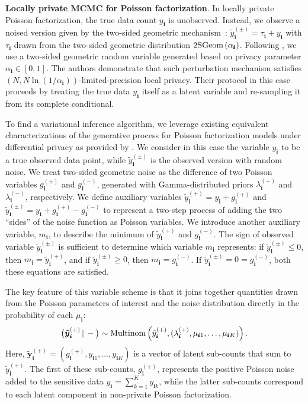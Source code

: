 \documentclass{article}
\newcommand{\subs}{\pmb{i}}
\newcommand{\wsup}[2]{#1_{\subs}^{(#2)}}
\newcommand{\ytP}{\wsup{\tilde{y}}{+}}
\newcommand{\ytPM}{\wsup{\tilde{y}}{\pm}}
\newcommand{\ysk}{y_{\subs k}}
\newcommand{\ys}{y_{\subs}}
\newcommand{\taus}{\tau_{\subs}}
\newcommand{\lamP}{\wsup{\lambda}{+}}
\newcommand{\lamM}{\wsup{\lambda}{-}}
\newcommand{\gP}{\wsup{g}{+}}
\newcommand{\gM}{\wsup{g}{-}}
\newcommand{\mus}{\mu_{\subs}}
\newcommand{\ms}{m_{\subs}}
\newcommand{\yvtP}{\boldsymbol{\tilde{y}}_{\subs}^{(+)}}
\newcommand{\Multi}[1]{\textup{Multinom}\left( #1 \right)}
\newcommand{\Geo}[1]{\textup{2SGeom}\left( #1 \right)}
\newcommand{\given}{\,|\,}
\newcommand{\compcond}[1]{\big(#1\given-\big)}
\begin{document}
  \textbf{Locally private MCMC for Poisson factorization}.  In locally
  private Poisson factorization, the true data count $\ys$ is
  unobserved. Instead, we observe a noised version given by the
  two-sided geometric mechanism~\citep{ghosh2012universally}:
  $\ytPM = \taus + \ys$ with $\taus$ drawn from the two-sided
  geometric distribution $\Geo{\alpha_{\subs}}$. Following
  \cite{schein2018locally}, we use a two-sided geometric random
  variable generated based on privacy parameter
  $\alpha_{\subs} \in [0,1]$.  The authors demonstrate that such
  perturbation mechanism satisfies
  $(N, N \ln(1/\alpha_{\subs}))$-limited-precision local
  privacy.%
Their protocol in this case proceeds by treating the true data $\ys$
  itself as a latent variable and re-sampling it from its complete conditional.

  To find a variational inference algorithm, we leverage existing equivalent
  characterizations of the generative process for Poisson factorization models
  under differential privacy as provided by \citep{schein2018locally}. We
  consider in this case the variable $\ys$ to be a true observed data point,
  while $\ytPM$ is the observed version with random noise. We treat two-sided
  geometric noise as the difference of two Poisson variables $\gP$ and $\gM$,
  generated with Gamma-distributed priors $\lamP$ and $\lamM$, respectively. We
  define auxiliary variables $\ytP = \ys + \gP$ and $\ytPM = \ys + \gP - \gM$ to
  represent a two-step process of adding the two ``sides'' of the noise function
  as Poisson variables. We introduce another auxiliary variable, $\ms$, to
  describe the minimum of $\ytP$ and $\gM$. The sign of observed variable
  $\ytPM$ is sufficient to determine which variable $\ms$ represents: if $\ytPM
  \leq 0$, then $\ms = \ytP$, and if $\ytPM \geq 0$, then $\ms = \gM$. If $\ytPM
  = 0 = \gM$, both these equations are satisfied.

  The key feature of this variable scheme is that it joins together quantities drawn from
  the Poisson parameters of interest and the noise
  distribution directly in the probability of each $\mus$:
  \begin{equation}
    \compcond{\yvtP} \sim \Multi{\ytP, (\lamP, \mu_{\subs 1}, \dots, \mu_{\subs K})}.
  \end{equation} 
  Here, $\yvtP=(\gP, y_{\subs 1}, \dots, y_{\subs K})$ is a vector of latent
  sub-counts that sum to $\ytP$. The first of these sub-counts, $\gP$, represents
  the positive Poisson noise added to the sensitive data $\ys=\sum_{k=1}^K \ysk$,
  while the latter sub-counts correspond to each latent component in non-private
  Poisson factorization.
\end{document}
